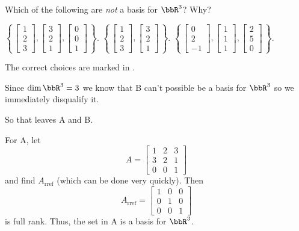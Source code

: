 \begin{questions}
  \question Which of the following are \emph{not} a basis for $\bbR^3$?
  Why?
  \begin{choices}
    \CorrectChoice%
    $\displaystyle\left\{\,
      \begin{bmatrix}1\\2\\3\end{bmatrix},
      \begin{bmatrix}3\\2\\1\end{bmatrix},
      \begin{bmatrix}0\\0\\1\end{bmatrix}%
      \,\right\}$.%
    \choice%
    $\displaystyle\left\{\,
      \begin{bmatrix}1\\2\\3\end{bmatrix},
      \begin{bmatrix}3\\2\\1\end{bmatrix}%
      \,\right\}$.%
    \CorrectChoice%
    $\displaystyle\left\{\,
      \begin{bmatrix}0\\2\\-1\end{bmatrix},
      \begin{bmatrix}1\\1\\1\end{bmatrix},
      \begin{bmatrix}2\\5\\0\end{bmatrix}%
      \,\right\}$.%
  \end{choices}
  \begin{solution}
    The correct choices are marked in .

    Since $\dim\bbR^3=3$ we know that B can't possible be a basis for
    $\bbR^3$ so we immediately disqualify it.

    So that leaves A and B.

    For A, let
    \[
      A=\begin{bmatrix}%
        1&2&3\\
        3&2&1\\
        0&0&1
      \end{bmatrix}
    \]
    and find $A_{\text{rref}}$ (which can be done very quickly). Then
    \[
      A_{\text{rref}}=%
      \begin{bmatrix}%
        1&0&0\\
        0&1&0\\
        0&0&1
      \end{bmatrix}
    \]
    is full rank. Thus, the set in A is a basis for $\bbR^3$.


\end{solution}
\end{questions}
